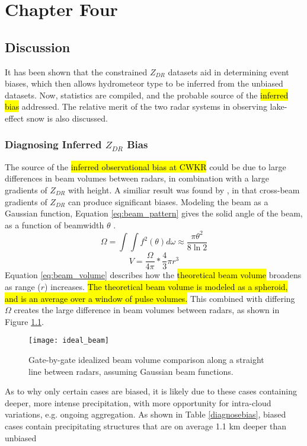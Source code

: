 \chapter{Chapter Four}
\section{Discussion}
It has been shown that the constrained $Z_{DR}$ datasets aid in determining event biases, which then allows hydrometeor type to be inferred from the unbiased
datasets. Now, statistics are compiled, and the probable source of the \hl{inferred bias} addressed. The relative merit of the two radar systems in observing lake-effect
snow is also discussed.
\subsection{Diagnosing Inferred $Z_{DR}$ Bias}
The source of the \hl{inferred observational bias at CWKR} could be due to large differences in beam volumes between radars, in combination with a large gradients of $Z_{DR}$ with height. A similiar result was found by \citep{Ryzhkov2007a}, in that cross-beam gradients of $Z_{DR}$ can produce significant biases. Modeling the beam as a Gaussian function, Equation \ref{eq:beam_pattern} gives the solid angle of the beam, as a function of beamwidth $\theta$ \citep{Probert1962}. 
\begin{equation}\label{eq:beam_pattern}
\Omega = \int \int f^{2}(\theta) d\omega \approx \frac{\pi \theta^{2}}{8 \ln 2}
\end{equation}
\begin{equation}\label{eq:beam_volume}
V = \frac{\Omega}{4\pi} * \frac{4}{3} \pi r^{3}
\end{equation}
 Equation \ref{eq:beam_volume} describes how the \hl{theoretical beam volume} broadens as range ($r$) increases. \hl{The theoretical beam volume is modeled as a spheroid, and is an average over a window of pulse volumes.} This combined with 
 differing $\Omega$ creates the large difference in beam volumes between radars, as shown in Figure \ref{fig:ideal_beam}.
\begin{figure}[H]
\centering
\texttt{[image: ideal\_beam]}
\caption{Gate-by-gate idealized beam volume comparison along a straight line between radars, assuming Gaussian beam functions.} 
\label{fig:ideal_beam}
\end{figure}
 As to why only certain cases are biased, it is likely due to these cases containing deeper, more intense 
 precipitation, with more opportunity for intra-cloud variations, e.g. ongoing aggregation. As shown in Table \ref{diagnosebias}, biased cases contain precipitating structures that are on average 1.1 km deeper than unbiased 
